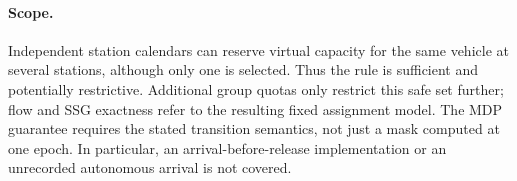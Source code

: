\paragraph{Scope.}
Independent station calendars can reserve virtual capacity for the
same vehicle at several stations, although only one is selected.
Thus the rule is sufficient and potentially restrictive. Additional
group quotas only restrict this safe set further; flow and SSG
exactness refer to the resulting fixed assignment model. The MDP
guarantee requires the stated transition semantics, not just a mask
computed at one epoch. In particular, an arrival-before-release
implementation or an unrecorded autonomous arrival is not covered.
